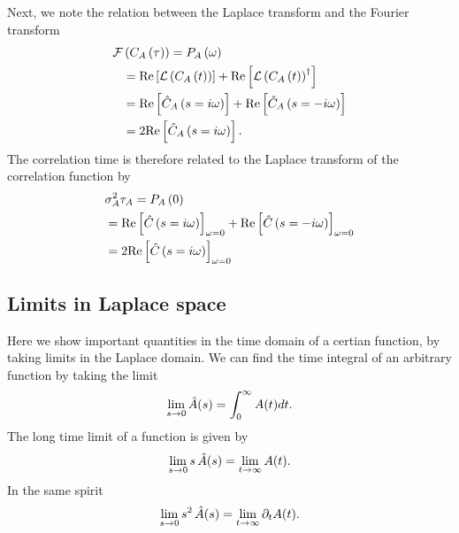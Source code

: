 Next, we note the relation between the Laplace transform and the Fourier transform
\begin{align}
\elabel{si:FT_of_corr}
{\cal F}&\br{C_A\br{\tau}}=P_A\br{\omega}\\
&={\rm Re}\sqbr{{\cal L}\br{C_A\br{t}}}+{\rm Re}\sqbr{{\cal L}\br{C_A\br{t}}^{\dagger}}\\
&={\rm Re}\sqbr{\hat{C}_A\br{s=i\omega}}+{\rm Re}\sqbr{\hat{C}_A\br{s=-i\omega}}\\
&=2{\rm Re}\sqbr{\hat{C}_A\br{s=i\omega}}.
\end{align}
The correlation time is therefore related to the Laplace transform of the correlation function by
\begin{align}
\elabel{si:laplace_corr_func_corr_time}
&\sigma_A^2\tau_A=P_A\br{0}\\
&={\rm Re}\sqbr{\hat{C}\br{s=i\omega}}_{\omega=0}+{\rm Re}\sqbr{\hat{C}\br{s=-i\omega}}_{\omega=0}\\
&=2{\rm Re}\sqbr{\hat{C}\br{s=i\omega}}_{\omega=0}
\end{align}


\subsection{ Limits in Laplace space}
Here we show important quantities in the time domain of a certian function, by taking limits in the Laplace domain. We can find the time integral of an arbitrary function by taking the limit
\begin{align}
\lim_{s \rightarrow 0} \hat{A}(s) = \int_0^\infty A(t) dt.
\elabel{si:int_vs_lap}
\end{align}
The long time limit of a function is given by
\begin{align}
\lim_{s \rightarrow 0} s \, \hat{A}(s) = \lim_{t \rightarrow \infty} A(t).
\elabel{si:longt_in_lap}
\end{align}
In the same spirit
\begin{align}
\lim_{s \rightarrow 0} s^2 \, \hat{A}(s) = \lim_{t \rightarrow \infty} \partial_t A(t).
\elabel{si:longt_in_lap2}
\end{align}



